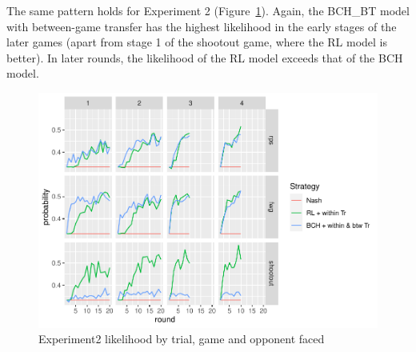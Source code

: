 \documentclass[man,floatsintext]{apa6}
\begin{document}
The same pattern holds for Experiment 2 (Figure~\ref{fig:exp2-lik-by-tr}). Again, the BCH\_BT model with between-game transfer has the highest likelihood in the early stages of the later games (apart from stage 1 of the shootout game, where the RL model is better). In later rounds, the likelihood of the RL model exceeds that of the BCH model.

\begin{figure}

{\centering \includegraphics{paper_draft_2021_files/figure-latex/exp2-lik-by-tr-1} 

}

\caption{Experiment2 likelihood by trial, game and opponent faced}\label{fig:exp2-lik-by-tr}
\end{figure}
\end{document}
